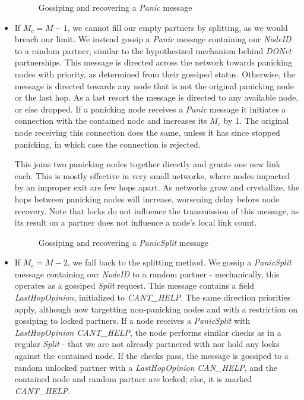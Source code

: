 \documentclass[12pt,a4paper]{article}
\begin{document}
\begin{itemize}
	\begin{figure}[!ht]
		\centering
		\resizebox{0.8\textwidth}{!}{%
			
		}%
		\caption{Gossiping and recovering a \textit{Panic} message}
		\label{panic}
	\end{figure}
	\item If \(M_c = M - 1\), we cannot fill our empty partners by splitting, as we would breach our limit. We instead gossip a 
	\textit{Panic} message containing our \textit{NodeID} to a random partner, similar to the hypothesized mechanism behind \textit{DONet} partnerships. This message is directed across the network towards panicking nodes with priority, as determined from their gossiped status. Otherwise, the message is directed towards any node that is not the original panicking node or the last hop. As a last resort the message is directed to any available node, or else dropped. If a panicking node receives a \textit{Panic} message it initiates a connection with the contained node and increases its \(M_c\) by 1. The original node receiving this connection does the same, unless it has since stopped panicking, in which case the connection is rejected.
	
	This joins two panicking nodes together directly and grants one new link each. This is mostly effective in very small networks, where nodes impacted by an improper exit are few hops apart. As networks grow and crystallize, the hops between panicking nodes will increase, worsening delay before node recovery. Note that locks do not influence the transmission of this message, as its result on a partner does not influence a node's local link count.
	
	\begin{figure}[!ht]
		\centering
		\resizebox{0.8\textwidth}{!}{%
			
		}%
		\caption{Gossiping and recovering a \textit{PanicSplit} message}
		\label{panicsplit}
	\end{figure}
	
	\item If \(M_c = M - 2\), we fall back to the splitting method. We gossip a \textit{PanicSplit} message containing our \textit{NodeID} to a random partner - mechanically, this operates as a gossiped \textit{Split} request. This message contains a field \textit{LastHopOpinion}, initialized to \textit{CANT\_HELP}. The same direction priorities apply, although now targetting non-panicking nodes and with a restriction on gossiping to locked partners. If a node receives a \textit{PanicSplit} with \textit{LastHopOpinion CANT\_HELP}, the node performs similar checks as in a regular \textit{Split} - that we are not already partnered with nor hold any locks against the contained node. If the checks pass, the message is gossiped to a random unlocked partner with a \textit{LastHopOpinion} \textit{CAN\_HELP}, and the contained node and random partner are locked; else, it is marked \textit{CANT\_HELP}.
	

\end{itemize}
\end{document}
